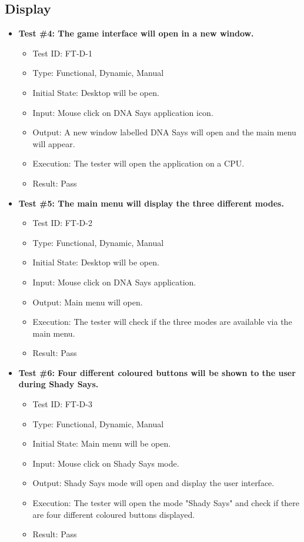 \documentclass[12pt, titlepage]{article}
\begin{document}
\subsection{Display}

\begin{itemize}

\item \textbf{Test \#4: The game interface will open in a new window.}
\begin{itemize}
\item Test ID: FT-D-1
\item Type: Functional, Dynamic, Manual 		
\item Initial State: Desktop will be open. 				
\item Input: Mouse click on DNA Says application icon. 					
\item Output: A new window labelled DNA Says will open and the main menu will appear.  					
\item Execution: The tester will open the application on a CPU.
\item Result: Pass
\end{itemize}

\item \textbf{Test \#5: The main menu will display the three different modes.}
\begin{itemize}
\item Test ID: FT-D-2
\item Type: Functional, Dynamic, Manual	
\item Initial State: Desktop will be open.					
\item Input: Mouse click on DNA Says application.					
\item Output: Main menu will open. 					
\item Execution: The tester will check if the three modes are available via the main menu.
\item Result: Pass
\end{itemize}

\item \textbf{Test \#6: Four different coloured buttons will be shown to the user during Shady Says.}
\begin{itemize}
\item Test ID: FT-D-3
\item Type: Functional, Dynamic, Manual		
\item Initial State: Main menu will be open.					
\item Input: Mouse click on Shady Says mode.					
\item Output: Shady Says mode will open and display the user interface.					
\item Execution: The tester will open the mode "Shady Says" and check if there are four different coloured buttons displayed.
\item Result: Pass
\end{itemize}


\end{itemize}
\end{document}
